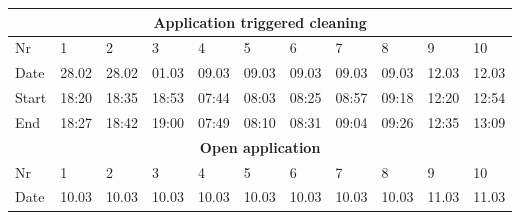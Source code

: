 \begin{table}[H]
\begin{tabular}{|lllllllllll|}
\multicolumn{11}{|c|}{\textbf{Application triggered cleaning}}                                                                                                                                                                                                                                            \\ \hline
\multicolumn{1}{|l|}{Nr} & \multicolumn{1}{l|}{1}     & \multicolumn{1}{l|}{2}     & \multicolumn{1}{l|}{3}     & \multicolumn{1}{l|}{4}     & \multicolumn{1}{l|}{5}     & \multicolumn{1}{l|}{6}     & \multicolumn{1}{l|}{7}     & \multicolumn{1}{l|}{8}     & \multicolumn{1}{l|}{9}     & 10    \\ \hline
\multicolumn{1}{|l|}{Date}   & \multicolumn{1}{l|}{28.02} & \multicolumn{1}{l|}{28.02} & \multicolumn{1}{l|}{01.03} & \multicolumn{1}{l|}{09.03} & \multicolumn{1}{l|}{09.03} & \multicolumn{1}{l|}{09.03} & \multicolumn{1}{l|}{09.03} & \multicolumn{1}{l|}{09.03} & \multicolumn{1}{l|}{12.03} & 12.03 \\ \hline
\multicolumn{1}{|l|}{Start}  & \multicolumn{1}{l|}{18:20} & \multicolumn{1}{l|}{18:35} & \multicolumn{1}{l|}{18:53} & \multicolumn{1}{l|}{07:44} & \multicolumn{1}{l|}{08:03} & \multicolumn{1}{l|}{08:25} & \multicolumn{1}{l|}{08:57} & \multicolumn{1}{l|}{09:18} & \multicolumn{1}{l|}{12:20} & 12:54 \\ \hline
\multicolumn{1}{|l|}{End}    & \multicolumn{1}{l|}{18:27} & \multicolumn{1}{l|}{18:42} & \multicolumn{1}{l|}{19:00} & \multicolumn{1}{l|}{07:49} & \multicolumn{1}{l|}{08:10} & \multicolumn{1}{l|}{08:31} & \multicolumn{1}{l|}{09:04} & \multicolumn{1}{l|}{09:26} & \multicolumn{1}{l|}{12:35} & 13:09 \\ \hline
\multicolumn{11}{|c|}{\textbf{Open application}}                                                                                                                                                                                                                                                          \\ \hline
\multicolumn{1}{|l|}{Nr} & \multicolumn{1}{l|}{1}     & \multicolumn{1}{l|}{2}     & \multicolumn{1}{l|}{3}     & \multicolumn{1}{l|}{4}     & \multicolumn{1}{l|}{5}     & \multicolumn{1}{l|}{6}     & \multicolumn{1}{l|}{7}     & \multicolumn{1}{l|}{8}     & \multicolumn{1}{l|}{9}     & 10    \\ \hline
\multicolumn{1}{|l|}{Date}   & \multicolumn{1}{l|}{10.03} & \multicolumn{1}{l|}{10.03} & \multicolumn{1}{l|}{10.03} & \multicolumn{1}{l|}{10.03} & \multicolumn{1}{l|}{10.03} & \multicolumn{1}{l|}{10.03} & \multicolumn{1}{l|}{10.03} & \multicolumn{1}{l|}{10.03} & \multicolumn{1}{l|}{11.03} & 11.03 \\ \hline

\end{tabular}
\end{table}
